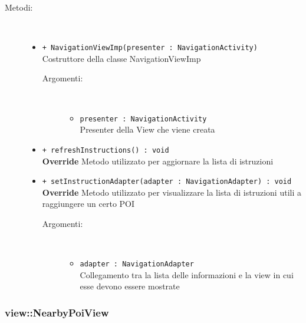 \documentclass[../DefinizioneDiProdotto.tex]{subfiles}
\begin{document}
\begin{description}
\begin{itemize}
\end{itemize}
\item[Metodi:] \
\begin{itemize}
\item \texttt{+ NavigationViewImp(presenter : NavigationActivity)}\\
Costruttore della classe NavigationViewImp
 \begin{description}
\item[Argomenti:] \
\begin{itemize}
\item \texttt{presenter : NavigationActivity}\\
Presenter della View che viene creata\end{itemize}
\end{description}
\item \texttt{+ refreshInstructions() : void}\\
\textbf{Override} Metodo utilizzato per aggiornare la lista di istruzioni
 \item \texttt{+ setInstructionAdapter(adapter : NavigationAdapter) : void}\\
\textbf{Override} Metodo utilizzato per visualizzare la lista di istruzioni utili a raggiungere un certo POI
 \begin{description}
\item[Argomenti:] \
\begin{itemize}
\item \texttt{adapter : NavigationAdapter}\\
Collegamento tra la lista delle informazioni e la view in cui esse devono essere mostrate\end{itemize}
\end{description}
\end{itemize}
\end{description}

\subsubsection{view::NearbyPoiView}
\end{document}
